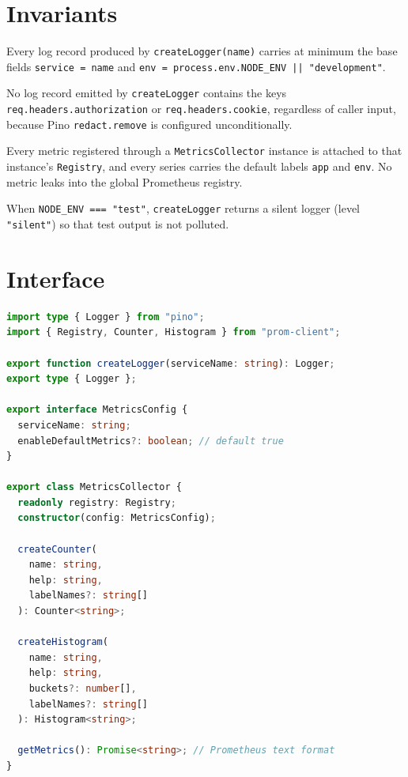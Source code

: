 \section{Invariants}
\begin{invariant}
Every log record produced by \texttt{createLogger(name)} carries at minimum the base fields \texttt{service = name} and \texttt{env = process.env.NODE\_ENV || "development"}.
\end{invariant}

\begin{invariant}
No log record emitted by \texttt{createLogger} contains the keys \texttt{req.headers.authorization} or \texttt{req.headers.cookie}, regardless of caller input, because Pino \texttt{redact.remove} is configured unconditionally.
\end{invariant}

\begin{invariant}
Every metric registered through a \texttt{MetricsCollector} instance is attached to that instance's \texttt{Registry}, and every series carries the default labels \texttt{app} and \texttt{env}. No metric leaks into the global Prometheus registry.
\end{invariant}

\begin{invariant}
When \texttt{NODE\_ENV === "test"}, \texttt{createLogger} returns a silent logger (level \texttt{"silent"}) so that test output is not polluted.
\end{invariant}

\section{Interface}

\begin{lstlisting}[language=TypeScript]
import type { Logger } from "pino";
import { Registry, Counter, Histogram } from "prom-client";

export function createLogger(serviceName: string): Logger;
export type { Logger };

export interface MetricsConfig {
  serviceName: string;
  enableDefaultMetrics?: boolean; // default true
}

export class MetricsCollector {
  readonly registry: Registry;
  constructor(config: MetricsConfig);

  createCounter(
    name: string,
    help: string,
    labelNames?: string[]
  ): Counter<string>;

  createHistogram(
    name: string,
    help: string,
    buckets?: number[],
    labelNames?: string[]
  ): Histogram<string>;

  getMetrics(): Promise<string>; // Prometheus text format
}
\end{lstlisting}

